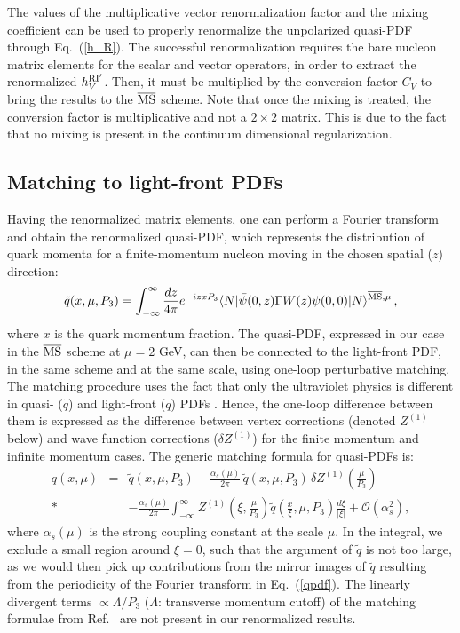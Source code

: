 \vspace*{0.5cm}
The values of the multiplicative vector renormalization factor and the mixing coefficient can be used to properly
renormalize the unpolarized quasi-PDF through Eq.~(\ref{h_R}). The successful renormalization requires the bare
nucleon matrix elements for the scalar and vector operators, in order to extract the renormalized $h_V^{\rm RI'}$.
Then, it must be multiplied by the conversion factor $C_V$ to bring the results to the ${\overline{\rm MS}}$ scheme.
Note that once the mixing is treated, the conversion factor is multiplicative and not a $2{\times}2$ matrix.
This is due to the fact that no mixing is present in the continuum dimensional regularization.


\subsection{Matching to light-front PDFs}
Having the renormalized matrix elements, one can perform a Fourier transform and obtain the renormalized quasi-PDF,
which represents the distribution of quark momenta for a finite-momentum nucleon moving in the chosen spatial ($z$) direction:
\begin{equation}
\label{qpdf}
\tilde{q}(x,\mu,P_3) = \int_{-\infty}^\infty \frac{dz}{4\pi} e^{-i z x P_3} \langle N |
\bar{\psi}(0,z)\Gamma W(z) \psi(0,0) |N\rangle^{{\overline{\rm MS}},\mu}\,,
\end{equation}
where $x$ is the quark momentum fraction.
The quasi-PDF, expressed in our case in the ${\overline{\rm MS}}$ scheme at $\mu{=}2$ GeV, can then be connected to the light-front PDF, in the same scheme and at the same scale, using one-loop perturbative matching.
The matching procedure uses the fact that only the ultraviolet physics is different in quasi- ($\tilde{q}$) and light-front ($q$) PDFs \cite{Xiong:2013bka}.
Hence, the one-loop difference between them is expressed as the difference between vertex corrections (denoted $Z^{(1)}$ below) and wave function corrections ($\delta Z^{(1)}$) for the finite momentum and infinite momentum cases.
The generic matching formula for quasi-PDFs is: \cite{Ji:2015jwa,Chen:2016fxx}
\begin{eqnarray}
\label{invq}
q\left(x,\mu\right) &=& \tilde{q}(x,\mu,P_3) - \frac{\alpha_s(\mu)}{2\pi} \,\tilde{q}(x,\mu,P_3)\,\delta Z^{(1)}\!\left( \frac{\mu}{P_3}\right)  \nonumber\\*
& & - \frac{\alpha_s(\mu)}{2\pi} \int_{-\infty}^{\infty} Z^{(1)}\!\left( \xi, \frac{\mu}{P_3} \right) \tilde{q}\! \left( \frac{x}{\xi},\mu,P_3 \right) \frac{d\xi}{|\xi |} + \mathcal{O}(\alpha_s^2),
\end{eqnarray}
where $\alpha_s(\mu)$ is the strong coupling constant at the scale $\mu$.
In the integral, we exclude a small region around $\xi=0$, such that the argument of $\tilde{q}$ is not too large, as we would then pick up contributions from the mirror images of $\tilde{q}$ resulting from the periodicity of the Fourier transform in Eq.~(\ref{qpdf}).
The linearly divergent terms $\propto\Lambda/P_3$ ($\Lambda$: transverse momentum cutoff) of the matching
formulae from Ref.~\cite{Xiong:2013bka} are not present in our renormalized results.

